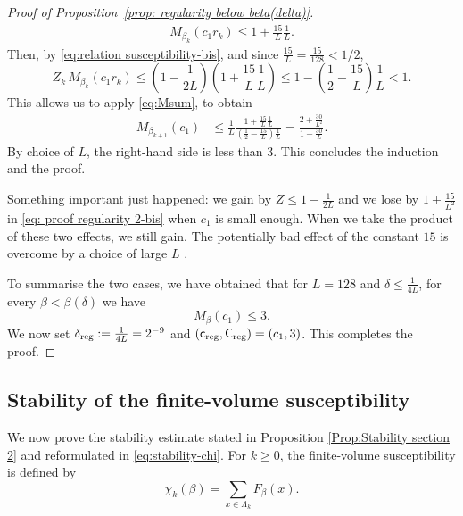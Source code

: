 \documentclass[11pt,a4paper]{article}
\numberwithin{equation}{section}
\theoremstyle{plain}
\theoremstyle{definition}
\newcommand\1{\mathds{1}}
\newcommand\creg{\mathsf{c}_{\textup{reg}}}
\newcommand\Creg{\mathsf{C}_{\textup{reg}}}
\newcommand{\deltareg}{\delta_{\textup{reg}}}
\begin{document}
\begin{proof}[Proof of Proposition~\textup{\ref{prop: regularity below beta(delta)}}]
\begin{align}\label{eq:regM}
M_{\beta_k}(c_1r_k)
\le 1+  \frac{15}{L} \frac{1}{L}.
\end{align}
Then, by \eqref{eq:relation susceptibility-bis}, and since $\tfrac{15}{L}=\tfrac{15}{128}<1/2$,
\begin{equation}
\label{eq:ZMbd}
    Z_{k}\, M_{\beta_k}(c_1r_k)
    \le
    \left(1-\frac{1}{2L} \right) \left(1 + \frac{15}{L} \frac{1}{L} \right)
    \le
    1 - \left( \frac 12 - \frac{15}{L}\right) \frac 1L
    <1
    .
\end{equation}
This allows us to apply \eqref{eq:Msum}, to obtain
\begin{align}
    M_{\beta_{k+1}}(c_1)
	&
    \le
    \frac 1L \frac{1 + \frac{15}{L} \frac{1}{L}}{( \frac 12 - \frac{15}{L}) \frac 1L}
    =
    \frac{2 + \frac{30}{L^2}}{1 - \frac{30}{L}}
	.
\end{align}
By choice of $L$, the right-hand side is less than
$3$.
This concludes the induction and the proof.

Something important just happened:
we gain by $Z \le 1 -\frac{1}{2L}$ and we lose by $1+\frac{15}{L^2}$ in \eqref{eq: proof regularity 2-bis}
when $c_1$ is small
enough.
When we take the product of these two effects, we still gain.
The potentially bad effect of the constant $15$ is overcome by a choice of large $L$ .



To summarise the two cases, we have obtained that for $L=128$ and $\delta\leq \tfrac{1}{4L}$,  for every $\beta< \beta(\delta)$ we have
\begin{equation}
    M_\beta(c_1)
    \leq 3.
\end{equation}
We now set $\deltareg:=\frac{1}{4L} = 2^{-9}$ and $(\creg,\Creg)=(c_1,3)$.
This completes the proof.
\end{proof}



\subsection{Stability of the finite-volume susceptibility}\label{sec:stability}


We now prove the stability estimate stated in Proposition \ref{Prop:Stability section 2} and reformulated in \eqref{eq:stability-chi}. For $k\geq 0$, the finite-volume susceptibility is defined by
\begin{equation}
        \chi_k(\beta)=\sum_{x\in \Lambda_k}F_\beta(x).
\end{equation}
\end{document}
